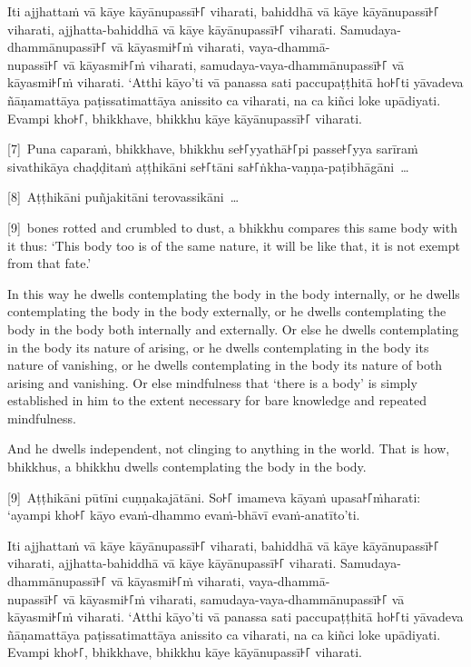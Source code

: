 Iti ajjhattaṁ vā kāye kāyānupassī꜔꜒ viharati, bahiddhā vā kāye kāyānupassī꜔꜒
viharati, ajjhatta-bahiddhā vā kāye kāyānupassī꜔꜒ viharati. Samudaya-dhammānupassī꜔꜒
vā kāyasmi꜔꜒ṁ viharati, vaya-dhammā-\\
nupassī꜔꜒ vā kāyasmi꜔꜒ṁ viharati, samudaya-vaya-dhammānupassī꜔꜒ vā kāyasmi꜔꜒ṁ viharati.
‘Atthi kāyo’ti vā panassa sati paccupaṭṭhitā ho꜔꜒ti yāvadeva ñāṇamattāya
paṭissatimattāya anissito ca viharati, na ca kiñci loke upādiyati. Evampi kho꜔꜒,
bhikkhave, bhikkhu kāye kāyānupassī꜔꜒ viharati.

[7]~Puna caparaṁ, bhikkhave, bhikkhu se꜔꜒yyathā꜔꜒pi passe꜔꜒yya sarīraṁ sivathikāya
chaḍḍitaṁ aṭṭhikāni se꜔꜒tāni sa꜔꜒ṅkha-vaṇṇa-paṭibhāgāni~\ldots{}

[8]~Aṭṭhikāni puñjakitāni terovassikāni~\ldots{}

\englishPage

[9]~bones rotted and crumbled to dust, a bhikkhu compares this same
body with it thus: ‘This body too is of the same nature, it will be like that,
it is not exempt from that fate.’

In this way he dwells contemplating the body in the body internally, or he
dwells contemplating the body in the body externally, or he dwells contemplating
the body in the body both internally and externally. Or else he dwells
contemplating in the body its nature of arising, or he dwells contemplating in
the body its nature of vanishing, or he dwells contemplating in the body its
nature of both arising and vanishing. Or else mindfulness that ‘there is a body’
is simply established in him to the extent necessary for bare knowledge and
repeated mindfulness.

And he dwells independent, not clinging to anything in the world. That is how,
bhikkhus, a bhikkhu dwells contemplating the body in the body.



\paliPage

[9]~Aṭṭhikāni pūtīni cuṇṇakajātāni. So꜔꜒ imameva kāyaṁ upasa꜔꜒ṁharati: ‘ayampi kho꜔꜒
kāyo evaṁ-dhammo evaṁ-bhāvī evaṁ-anatīto’ti.

Iti ajjhattaṁ vā kāye kāyānupassī꜔꜒ viharati, bahiddhā vā kāye kāyānupassī꜔꜒
viharati, ajjhatta-bahiddhā vā kāye kāyānupassī꜔꜒ viharati. Samudaya-dhammānupassī꜔꜒
vā kāyasmi꜔꜒ṁ viharati, vaya-dhammā-\\
nupassī꜔꜒ vā kāyasmi꜔꜒ṁ viharati, samudaya-vaya-dhammānupassī꜔꜒ vā kāyasmi꜔꜒ṁ viharati.
‘Atthi kāyo’ti vā panassa sati paccupaṭṭhitā ho꜔꜒ti yāvadeva ñāṇamattāya
paṭissatimattāya anissito ca viharati, na ca kiñci loke upādiyati. Evampi kho꜔꜒,
bhikkhave, bhikkhu kāye kāyānupassī꜔꜒ viharati.

